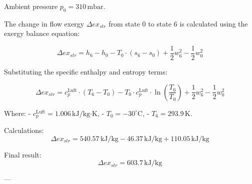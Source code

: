 Ambient pressure \( p_0 = 310 \, \text{mbar} \).  

The change in flow exergy \( \Delta ex_{str} \) from state 0 to state 6 is calculated using the exergy balance equation:  

\[
\Delta ex_{str} = h_6 - h_0 - T_0 \cdot (s_6 - s_0) + \frac{1}{2} w_6^2 - \frac{1}{2} w_0^2
\]  

Substituting the specific enthalpy and entropy terms:  

\[
\Delta ex_{str} = c_p^{\text{Luft}} \cdot (T_6 - T_0) - T_0 \cdot c_p^{\text{Luft}} \cdot \ln\left(\frac{T_6}{T_0}\right) + \frac{1}{2} w_6^2 - \frac{1}{2} w_0^2
\]  

Where:  
- \( c_p^{\text{Luft}} = 1.006 \, \text{kJ/kg·K} \),  
- \( T_0 = -30^\circ \text{C} \),  
- \( T_6 = 293.9 \, \text{K} \).  

Calculations:  
\[
\Delta ex_{str} = 540.57 \, \text{kJ/kg} - 46.37 \, \text{kJ/kg} + 110.05 \, \text{kJ/kg}
\]  

Final result:  
\[
\Delta ex_{str} = 603.7 \, \text{kJ/kg}
\]  

---